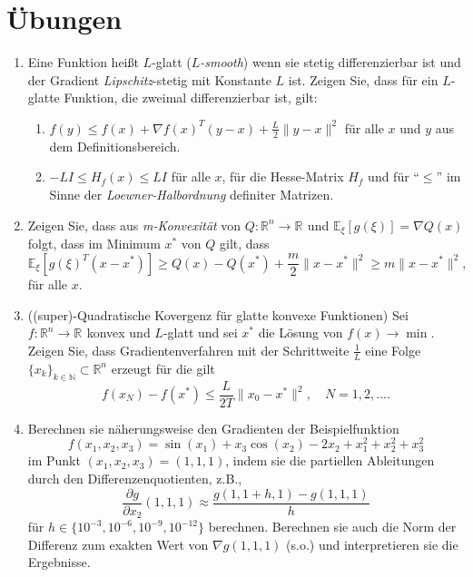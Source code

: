 \documentclass[
]{book}
\providecommand{\tightlist}{%
  \setlength{\itemsep}{0pt}\setlength{\parskip}{0pt}}
\theoremstyle{definition}
\theoremstyle{definition}
\theoremstyle{definition}
\theoremstyle{definition}
\theoremstyle{remark}
\begin{document}
\hypertarget{uxfcbungen-3}{%
\section{Übungen}\label{uxfcbungen-3}}

\begin{enumerate}
\def\labelenumi{\arabic{enumi}.}
\item
  Eine Funktion heißt \(L\)-glatt (\emph{\(L\)-smooth}) wenn sie stetig
  differenzierbar ist und der Gradient \emph{Lipschitz}-stetig mit Konstante \(L\) ist.
  Zeigen Sie, dass für ein \(L\)-glatte Funktion, die zweimal differenzierbar ist, gilt:

  \begin{enumerate}
  \def\labelenumii{\arabic{enumii}.}
  \tightlist
  \item
    \(f(y) \leq f(x) + \nabla f(x)^T(y-x) + \frac L2 \|y-x\|^2\) für alle \(x\) und \(y\) aus dem Definitionsbereich.
  \item
    \(-LI \leq H_f(x) \leq LI\) für alle \(x\), für die Hesse-Matrix
    \(H_f\) und für ``\(\leq\)'' im Sinne der \emph{Loewner-Halbordnung} definiter
    Matrizen.
  \end{enumerate}
\item
  Zeigen Sie, dass aus \emph{m-Konvexität} von \(Q\colon \mathbb R^{n}\to \mathbb R^{}\) und \(\mathbb E_\xi [g(\xi)] = \nabla Q(x)\) folgt, dass im Minimum \(x^*\) von \(Q\) gilt, dass
  \begin{equation*}
  \mathbb E_\xi[g(\xi)^T(x-x^*)] \geq Q(x)-Q(x^*) + \frac m2\|x - x^*\|^2  \geq m\|x - x^*\|^2,
  \end{equation*}
  für alle \(x\).
\item
  ((super)-Quadratische Kovergenz für glatte konvexe Funktionen) Sei \(f\colon \mathbb R^{n}\to \mathbb R^{}\) konvex und \(L\)-glatt und sei
  \(x^*\) die Lösung von \(f(x)\to \min\). Zeigen Sie, dass
  Gradientenverfahren mit der Schrittweite \(\frac 1L\) eine Folge \(\{x_k\}_{k\in \mathbb N}\subset \mathbb R^{n}\) erzeugt für die gilt
  \begin{equation*}
  f(x_N)-f(x^*) \leq \frac{L}{2T} \|x_0 - x^*\|^2, \quad N=1, 2, \dotsc .
  \end{equation*}
\item
  Berechnen sie näherungsweise den Gradienten der Beispielfunktion
  \begin{equation*}
  f(x_1, x_2, x_3) = \sin(x_1) + x_3\cos(x_2) - 2x_2 + x_1^2 + x_2^2 + x_3^2
  \end{equation*}
  im Punkt \((x_1, x_2, x_3) = (1, 1, 1)\),
  indem sie die partiellen Ableitungen durch den Differenzenquotienten, z.B.,
  \begin{equation*}
  \frac{\partial g}{\partial x_2}(1, 1, 1) \approx \frac{g(1, 1+h, 1) - g(1, 1,1)}{h}
  \end{equation*}
  für \(h\in\{10^{-3}, 10^{-6}, 10^{-9}, 10^{-12}\}\) berechnen. Berechnen sie auch die Norm der Differenz zum exakten Wert von \(\nabla g(1, 1, 1)\) (s.o.) und interpretieren sie die Ergebnisse.
\end{enumerate}
\end{document}
